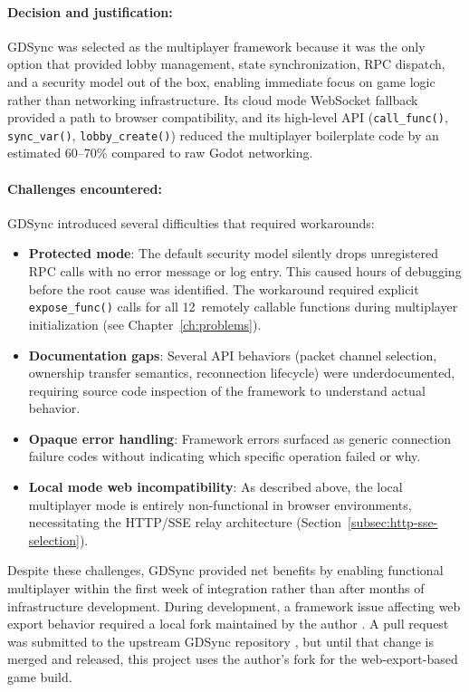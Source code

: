 \paragraph*{Decision and justification:}

GDSync was selected as the multiplayer framework because it was the only option that provided lobby management, state synchronization, RPC dispatch, and a security model out of the box, enabling immediate focus on game logic rather than networking infrastructure. Its cloud mode WebSocket fallback provided a path to browser compatibility, and its high-level API (\texttt{call\_func()}, \texttt{sync\_var()}, \texttt{lobby\_create()}) reduced the multiplayer boilerplate code by an estimated 60--70\% compared to raw Godot networking.

\paragraph*{Challenges encountered:}

GDSync introduced several difficulties that required workarounds:

\begin{itemize}
    \item \textbf{Protected mode}: The default security model silently drops unregistered RPC calls with no error message or log entry. This caused hours of debugging before the root cause was identified. The workaround required explicit \texttt{expose\_func()} calls for all 12~remotely callable functions during multiplayer initialization (see Chapter~\ref{ch:problems}).
    \item \textbf{Documentation gaps}: Several API behaviors (packet channel selection, ownership transfer semantics, reconnection lifecycle) were underdocumented, requiring source code inspection of the framework to understand actual behavior.
    \item \textbf{Opaque error handling}: Framework errors surfaced as generic connection failure codes without indicating which specific operation failed or why.
    \item \textbf{Local mode web incompatibility}: As described above, the local multiplayer mode is entirely non-functional in browser environments, necessitating the HTTP/SSE relay architecture (Section~\ref{subsec:http-sse-selection}).
\end{itemize}

Despite these challenges, GDSync provided net benefits by enabling functional multiplayer within the first week of integration rather than after months of infrastructure development. During development, a framework issue affecting web export behavior required a local fork maintained by the author \citep{gdsync_fork}. A pull request was submitted to the upstream GDSync repository \citep{gdsync_framework}, but until that change is merged and released, this project uses the author's fork for the web-export-based game build.

